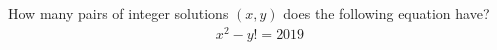 How many pairs of integer solutions $(x,y)$ does the following equation have?
\begin{align*}
x^{2} - y! = 2019
\end{align*}